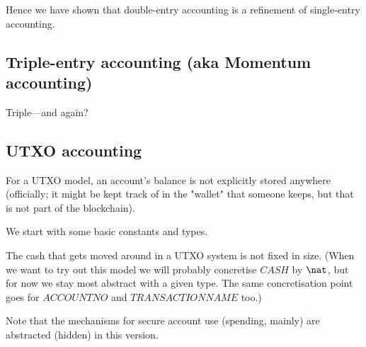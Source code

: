 \documentclass[11pt]{amsart}
\begin{document}
Hence we have shown that double-entry accounting is a refinement of single-entry accounting.

\subsection{Triple-entry accounting (aka Momentum accounting)}

Triple---and again?

\subsection{UTXO accounting}

For a UTXO model, an account's balance is not explicitly stored anywhere
(officially; it might be kept track of in the "wallet" that someone keeps,
but that is not part of the blockchain).
 
We start with some basic constants and types.



%
%
%

The cash that gets moved around in a UTXO system is not fixed in size. (When we want to try out this model we will probably concretise $CASH$ by $\nat$, but for now we stay most abstract with a given type. The same concretisation point goes for $ACCOUNTNO$ and $TRANSACTIONNAME$ too.)


Note that the mechanisms for secure account use (spending, mainly) are abstracted (hidden) in this version. 
\end{document}
